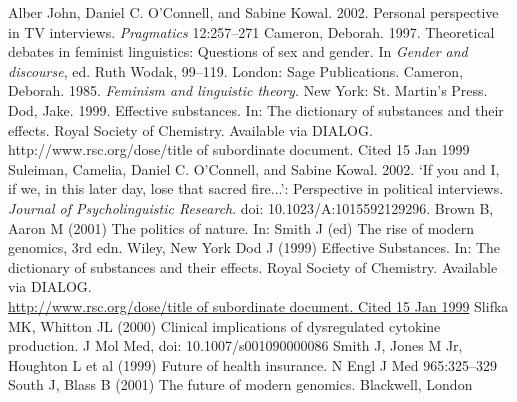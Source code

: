 \begin{thebibliography}{99.}
  \bigskip
   Alber John, Daniel C. O'Connell, and Sabine Kowal. 2002. Personal perspective in TV interviews. \textit{Pragmatics} 12:257--271
   Cameron, Deborah. 1997. Theoretical debates in feminist linguistics: Questions of sex and gender. In \textit{Gender and discourse}, ed. Ruth Wodak, 99--119. London: Sage Publications.
   Cameron, Deborah. 1985. \textit{Feminism and linguistic theory.} New York: St. Martin's Press.
   Dod, Jake. 1999. Effective substances. In: The dictionary of substances and their effects. Royal Society of Chemistry. Available via DIALOG. \\
  http://www.rsc.org/dose/title of subordinate document. Cited 15 Jan 1999
   Suleiman, Camelia, Daniel C. O'Connell, and Sabine Kowal. 2002. `If you and I, if we, in this later day, lose that sacred fire...': Perspective in political interviews. \textit{Journal of Psycholinguistic Research}. doi: 10.1023/A:1015592129296.
  \bigskip
   Brown B, Aaron M (2001) The politics of nature. In: Smith J (ed) The rise of modern genomics, 3rd edn. Wiley, New York 
   Dod J (1999) Effective Substances. In: The dictionary of substances and their effects. Royal Society of Chemistry. Available via DIALOG. \\
  \url{http://www.rsc.org/dose/title of subordinate document. Cited 15 Jan 1999}
   Slifka MK, Whitton JL (2000) Clinical implications of dysregulated cytokine production. J Mol Med, doi: 10.1007/s001090000086
   Smith J, Jones M Jr, Houghton L et al (1999) Future of health insurance. N Engl J Med 965:325--329
   South J, Blass B (2001) The future of modern genomics. Blackwell, London 
\end{thebibliography}
